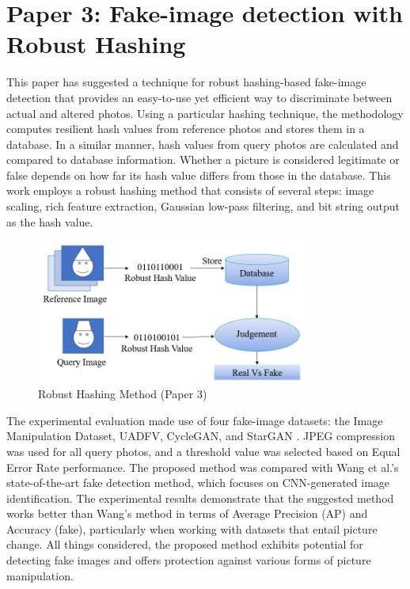 \documentclass[a4paper,14pt]{report}
\begin{document}
\section{Paper 3: Fake-image detection with Robust Hashing}
This paper has suggested a technique for robust hashing-based fake-image detection that provides an easy-to-use yet efficient way to discriminate between actual and altered photos. Using a particular hashing technique, the methodology computes resilient hash values from reference photos and stores them in a database. In a similar manner, hash values from query photos are calculated and compared to database information. Whether a picture is considered legitimate or false depends on how far its hash value differs from those in the database. This work employs a robust hashing method that consists of several steps: image scaling, rich feature extraction, Gaussian low-pass filtering, and bit string output as the hash value.
\begin{figure}[H]
    \centering
    \includegraphics[width=0.8\textwidth]{Images/method_paper3.png}
    \caption{Robust Hashing Method (Paper 3)}
    \label{fig:data_transformation}
\end{figure}
The experimental evaluation made use of four fake-image datasets: the Image Manipulation Dataset, UADFV, CycleGAN, and StarGAN \cite{10} \cite{18}. JPEG compression was used for all query photos, and a threshold value was selected based on Equal Error Rate performance. The proposed method was compared with Wang et al.'s state-of-the-art fake detection method, which focuses on CNN-generated image identification. The experimental results demonstrate that the suggested method works better than Wang's method in terms of Average Precision (AP) and Accuracy (fake), particularly when working with datasets that entail picture change. All things considered, the proposed method exhibits potential for detecting fake images and offers protection against various forms of picture manipulation.
\vspace{5cm}
\end{document}
